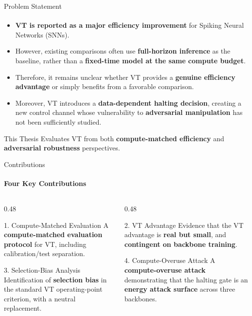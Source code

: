 \documentclass[aspectratio=169,11pt]{beamer}
\begin{document}
\begin{frame}{Problem Statement}
\framesubtitle{}
\begin{itemize}
    \item \textbf{VT is reported as a major efficiency improvement} for
    Spiking Neural Networks (SNNs).
    \item However, existing comparisons often use
    \textbf{full-horizon inference} as the baseline, rather than a
    \textbf{fixed-time model at the same compute budget}.
    \item Therefore, it remains unclear whether VT provides a
    \textbf{genuine efficiency advantage} or simply benefits from a
    favorable comparison.
    \item Moreover, VT introduces a \textbf{data-dependent halting decision},
    creating a new control channel whose vulnerability to
    \textbf{adversarial manipulation} has not been sufficiently studied.
\end{itemize}
\vspace{0.8mm}
\begin{alertblock}{This Thesis}
Evaluates VT from both \textbf{compute-matched efficiency} and
\textbf{adversarial robustness} perspectives.
\end{alertblock}
\end{frame}

\begin{frame}{Contributions}
\framesubtitle{Four Key Contributions}
\begin{columns}[T,onlytextwidth]
\begin{column}{0.48\textwidth}
\begin{block}{1. Compute-Matched Evaluation}
\small
A \textbf{compute-matched evaluation protocol} for VT,
including calibration/test separation.
\end{block}
\vspace{8mm}
\begin{block}{3. Selection-Bias Analysis}
\small
Identification of \textbf{selection bias} in the standard
VT operating-point criterion, with a neutral replacement.
\end{block}
\end{column}
\begin{column}{0.48\textwidth}
\begin{block}{2. VT Advantage}
\small
Evidence that the VT advantage is \textbf{real but small},
and \textbf{contingent on backbone training}.
\end{block}
\vspace{4mm}
\begin{block}{4. Compute-Overuse Attack}
\small
A \textbf{compute-overuse attack} demonstrating that the
halting gate is an \textbf{energy attack surface} across
three backbones.
\end{block}
\end{column}
\end{columns}
\end{frame}
\end{document}

